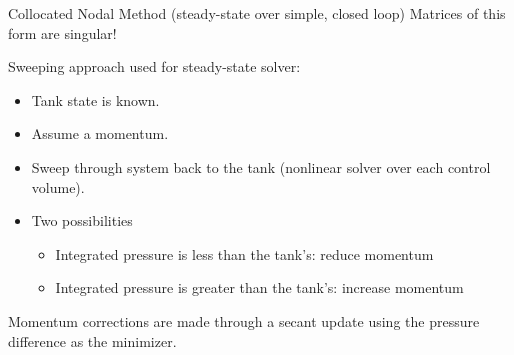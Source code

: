 \documentclass[10pt,t,xcolor=table]{beamer}
\newenvironment{Itemize}
    {\begin{itemize}\setlength{\itemsep}{0.8em}\setlength{\leftmargin}{0.0em}\setlength{\labelwidth}{0em}}
    {\end{itemize}}
\begin{document}
    \begin{frame}{Collocated Nodal Method {\small(steady-state over simple, closed loop)}}
        Matrices of this form are singular!
        
        Sweeping approach used for steady-state solver:
        \begin{Itemize}
            \item{Tank state is known.}
            \item{Assume a momentum.}
            \item{Sweep through system back to the tank (nonlinear solver over each control volume).}
            \item{Two possibilities}
                \begin{Itemize}
                    \item{Integrated pressure is less than the tank's: reduce momentum}
                    \item{Integrated pressure is greater than the tank's: increase momentum}
                \end{Itemize}
        \end{Itemize}
        Momentum corrections are made through a secant update using the pressure difference as the minimizer.
    \end{frame}
    
\end{document}
